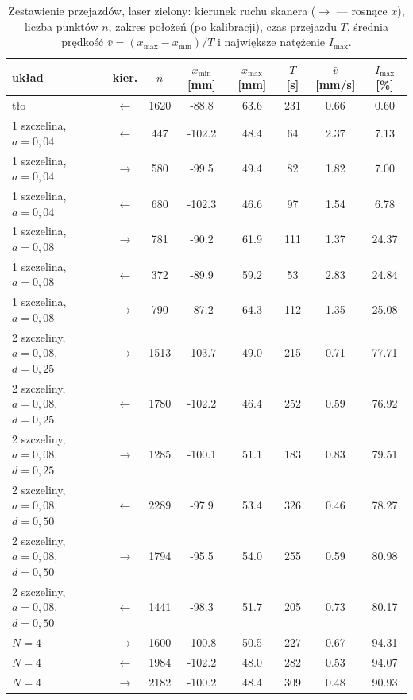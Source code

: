 \documentclass[12pt, a4paper]{article}
\begin{document}
\begin{table}[H]
    \centering
    \caption{Zestawienie przejazdów, laser zielony: kierunek ruchu skanera ($\rightarrow$ --- rosnące $x$),
             liczba punktów $n$, zakres położeń (po kalibracji), czas przejazdu $T$, średnia prędkość
             $\bar v = (x_\text{max} - x_\text{min})/T$ i największe natężenie $I_\text{max}$.}
    \label{tab:scans_green}
    \footnotesize
    \begin{tabular}{l c S[table-format=4.0] S[table-format=-3.1] S[table-format=-3.1]
                    S[table-format=3.0] S[table-format=1.2] S[table-format=2.2]}
        \toprule
        układ & kier. & {$n$} & {$x_\text{min}$ [mm]} & {$x_\text{max}$ [mm]} & {$T$ [s]}
              & {$\bar v$ [mm/s]} & {$I_\text{max}$ [\%]} \\
        \midrule
        tło & $\leftarrow$ & 1620 & -88.8 & 63.6 & 231 & 0.66 & 0.60 \\
        1 szczelina, $a = 0{,}04$ & $\leftarrow$ & 447 & -102.2 & 48.4 & 64 & 2.37 & 7.13 \\
        1 szczelina, $a = 0{,}04$ & $\rightarrow$ & 580 & -99.5 & 49.4 & 82 & 1.82 & 7.00 \\
        1 szczelina, $a = 0{,}04$ & $\leftarrow$ & 680 & -102.3 & 46.6 & 97 & 1.54 & 6.78 \\
        1 szczelina, $a = 0{,}08$ & $\rightarrow$ & 781 & -90.2 & 61.9 & 111 & 1.37 & 24.37 \\
        1 szczelina, $a = 0{,}08$ & $\leftarrow$ & 372 & -89.9 & 59.2 & 53 & 2.83 & 24.84 \\
        1 szczelina, $a = 0{,}08$ & $\rightarrow$ & 790 & -87.2 & 64.3 & 112 & 1.35 & 25.08 \\
        2 szczeliny, $a = 0{,}08$, $d = 0{,}25$ & $\rightarrow$ & 1513 & -103.7 & 49.0 & 215 & 0.71 & 77.71 \\
        2 szczeliny, $a = 0{,}08$, $d = 0{,}25$ & $\leftarrow$ & 1780 & -102.2 & 46.4 & 252 & 0.59 & 76.92 \\
        2 szczeliny, $a = 0{,}08$, $d = 0{,}25$ & $\rightarrow$ & 1285 & -100.1 & 51.1 & 183 & 0.83 & 79.51 \\
        2 szczeliny, $a = 0{,}08$, $d = 0{,}50$ & $\leftarrow$ & 2289 & -97.9 & 53.4 & 326 & 0.46 & 78.27 \\
        2 szczeliny, $a = 0{,}08$, $d = 0{,}50$ & $\rightarrow$ & 1794 & -95.5 & 54.0 & 255 & 0.59 & 80.98 \\
        2 szczeliny, $a = 0{,}08$, $d = 0{,}50$ & $\leftarrow$ & 1441 & -98.3 & 51.7 & 205 & 0.73 & 80.17 \\
        $N = 4$ & $\rightarrow$ & 1600 & -100.8 & 50.5 & 227 & 0.67 & 94.31 \\
        $N = 4$ & $\leftarrow$ & 1984 & -102.2 & 48.0 & 282 & 0.53 & 94.07 \\
        $N = 4$ & $\rightarrow$ & 2182 & -100.2 & 48.4 & 309 & 0.48 & 90.93 \\
        \bottomrule
    \end{tabular}
\end{table}
\end{document}

